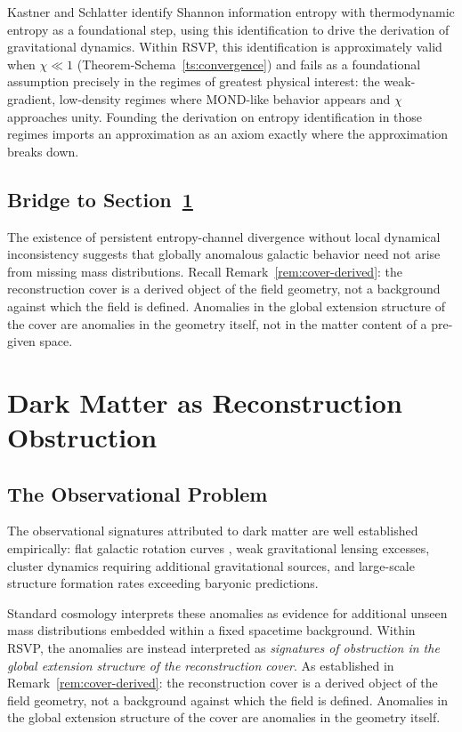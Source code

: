 \documentclass[11pt, a4paper]{article}
\theoremstyle{plain}
\theoremstyle{definition}
\theoremstyle{remark}
\begin{document}
Kastner and Schlatter \cite{kastner2024} identify Shannon information entropy with
thermodynamic entropy as a foundational step, using this identification to drive the
derivation of gravitational dynamics. Within RSVP, this identification is
approximately valid when $\chi \ll 1$ (Theorem-Schema~\ref{ts:convergence}) and
fails as a foundational assumption precisely in the regimes of greatest physical
interest: the weak-gradient, low-density regimes where MOND-like behavior appears
and $\chi$ approaches unity. Founding the derivation on entropy identification in
those regimes imports an approximation as an axiom exactly where the approximation
breaks down.

\subsection{Bridge to Section~\ref{sec:darkmatter}}

The existence of persistent entropy-channel divergence without local dynamical
inconsistency suggests that globally anomalous galactic behavior need not arise from
missing mass distributions. Recall Remark~\ref{rem:cover-derived}: the reconstruction
cover is a derived object of the field geometry, not a background against which the
field is defined. Anomalies in the global extension structure of the cover are
anomalies in the geometry itself, not in the matter content of a pre-given space.

\section{Dark Matter as Reconstruction Obstruction}
\label{sec:darkmatter}

\subsection{The Observational Problem}

The observational signatures attributed to dark matter are well established
empirically: flat galactic rotation curves \cite{mcgaugh2011,famaey2012}, weak
gravitational lensing excesses, cluster dynamics requiring additional gravitational
sources, and large-scale structure formation rates exceeding baryonic predictions.

Standard cosmology interprets these anomalies as evidence for additional unseen mass
distributions embedded within a fixed spacetime background. Within RSVP, the
anomalies are instead interpreted as \emph{signatures of obstruction in the global
extension structure of the reconstruction cover}. As established in
Remark~\ref{rem:cover-derived}: the reconstruction cover is a derived object of the
field geometry, not a background against which the field is defined. Anomalies in
the global extension structure of the cover are anomalies in the geometry itself.
\end{document}
